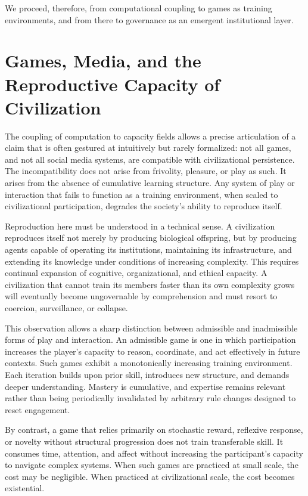 \documentclass[12pt,oneside]{book}
\begin{document}
We proceed, therefore, from computational coupling to games as training environments, and from there to governance as an emergent institutional layer.

\chapter{Games, Media, and the Reproductive Capacity of Civilization}

The coupling of computation to capacity fields allows a precise articulation of a claim that is often gestured at intuitively but rarely formalized: not all games, and not all social media systems, are compatible with civilizational persistence. The incompatibility does not arise from frivolity, pleasure, or play as such. It arises from the absence of cumulative learning structure. Any system of play or interaction that fails to function as a training environment, when scaled to civilizational participation, degrades the society’s ability to reproduce itself.

Reproduction here must be understood in a technical sense. A civilization reproduces itself not merely by producing biological offspring, but by producing agents capable of operating its institutions, maintaining its infrastructure, and extending its knowledge under conditions of increasing complexity. This requires continual expansion of cognitive, organizational, and ethical capacity. A civilization that cannot train its members faster than its own complexity grows will eventually become ungovernable by comprehension and must resort to coercion, surveillance, or collapse.

This observation allows a sharp distinction between admissible and inadmissible forms of play and interaction. An admissible game is one in which participation increases the player’s capacity to reason, coordinate, and act effectively in future contexts. Such games exhibit a monotonically increasing training environment. Each iteration builds upon prior skill, introduces new structure, and demands deeper understanding. Mastery is cumulative, and expertise remains relevant rather than being periodically invalidated by arbitrary rule changes designed to reset engagement.

By contrast, a game that relies primarily on stochastic reward, reflexive response, or novelty without structural progression does not train transferable skill. It consumes time, attention, and affect without increasing the participant’s capacity to navigate complex systems. When such games are practiced at small scale, the cost may be negligible. When practiced at civilizational scale, the cost becomes existential.
\end{document}
